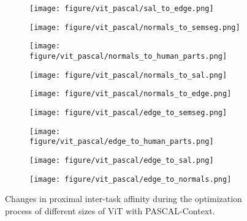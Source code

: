 \begin{figure}[h]
    \begin{subfigure}{0.24\textwidth}
        \texttt{[image: figure/vit\_pascal/sal\_to\_edge.png]}
    \end{subfigure}
        \hfill
    \begin{subfigure}{0.24\textwidth}
        \texttt{[image: figure/vit\_pascal/normals\_to\_semseg.png]}
    \end{subfigure}
    \begin{subfigure}{0.24\textwidth}
        \texttt{[image: figure/vit\_pascal/normals\_to\_human\_parts.png]}
    \end{subfigure}
    \begin{subfigure}{0.24\textwidth}
        \texttt{[image: figure/vit\_pascal/normals\_to\_sal.png]}
    \end{subfigure}
    \begin{subfigure}{0.24\textwidth}
        \texttt{[image: figure/vit\_pascal/normals\_to\_edge.png]}
    \end{subfigure}
        \hfill
    \begin{subfigure}{0.24\textwidth}
        \texttt{[image: figure/vit\_pascal/edge\_to\_semseg.png]}
    \end{subfigure}
    \begin{subfigure}{0.24\textwidth}
        \texttt{[image: figure/vit\_pascal/edge\_to\_human\_parts.png]}
    \end{subfigure}
    \begin{subfigure}{0.24\textwidth}
        \texttt{[image: figure/vit\_pascal/edge\_to\_sal.png]}
    \end{subfigure}
    \begin{subfigure}{0.24\textwidth}
        \texttt{[image: figure/vit\_pascal/edge\_to\_normals.png]}
    \end{subfigure}
    \caption{Changes in proximal inter-task affinity during the optimization process of different sizes of ViT with PASCAL-Context.}
    \label{fig:proximal_vit_pascal}
\end{figure}



